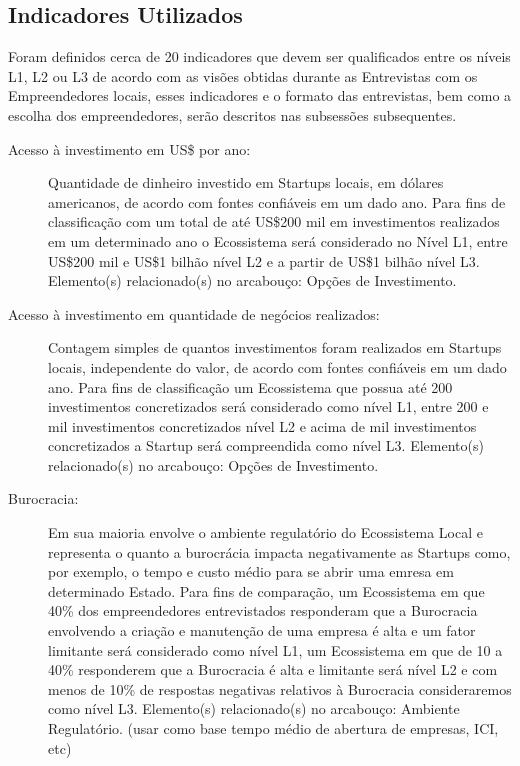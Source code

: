 \subsection{Indicadores Utilizados}
\label{subsection:indicadores_utilizados}

Foram definidos cerca de 20 indicadores que devem ser qualificados entre os níveis L1, L2 ou L3 de acordo com as visões obtidas durante as Entrevistas com os Empreendedores locais, esses indicadores e o formato das entrevistas, bem como a escolha dos empreendedores, serão descritos nas subsessões subsequentes. 

\begin{description}
  \item [Acesso à investimento em US\$ por ano:] Quantidade de dinheiro investido em Startups locais, em dólares americanos, de acordo com fontes confiáveis em um dado ano. Para fins de classificação com um total de até US\$200 mil em investimentos realizados em um determinado ano o Ecossistema será considerado no Nível L1, entre US\$200 mil e US\$1 bilhão nível L2 e a partir de US\$1 bilhão nível L3. Elemento(s) relacionado(s) no arcabouço: Opções de Investimento. 

  \item [Acesso à investimento em quantidade de negócios realizados:] Contagem simples de quantos investimentos foram realizados em Startups locais, independente do valor, de acordo com fontes confiáveis em um dado ano. Para fins de classificação um Ecossistema que possua até 200 investimentos concretizados será considerado como nível L1, entre 200 e mil investimentos concretizados nível L2 e acima de mil investimentos concretizados a Startup será compreendida como nível L3. Elemento(s) relacionado(s) no arcabouço: Opções de Investimento.

  \item [Burocracia:] Em sua maioria envolve o ambiente regulatório do Ecossistema Local e representa o quanto a burocrácia impacta negativamente as Startups como, por exemplo, o tempo e custo médio para se abrir uma emresa em determinado Estado. Para fins de comparação, um Ecossistema em que 40\% dos empreendedores entrevistados responderam que a Burocracia envolvendo a criação e manutenção de uma empresa é alta e um fator limitante será considerado como nível L1, um Ecossistema em que de 10 a 40\% responderem que a Burocracia é alta e limitante será nível L2 e com menos de 10\% de respostas negativas relativos à Burocracia consideraremos como nível L3. Elemento(s) relacionado(s) no arcabouço: Ambiente Regulatório. (usar como base tempo médio de abertura de empresas, ICI, etc)


\end{description}
